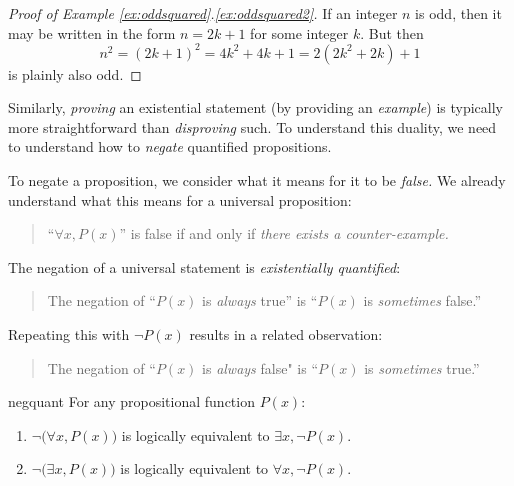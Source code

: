 \begin{proof}[Proof of Example \ref*{ex:oddsquared}.\ref{ex:oddsquared2}]
	If an integer $n$ is odd, then it may be written in the form $n=2k+1$ for some integer $k$. But then
	\[
		n^2 =(2k+1)^2 =4k^2+4k+1 =2(2k^2+2k)+1
		\]
	is plainly also odd.
\end{proof}

Similarly, \emph{proving} an existential statement (by providing an \emph{example}) is typically more straightforward than \emph{disproving} such. To understand this duality, we need to understand how to \emph{negate} quantified propositions.

\goodbreak



To negate a proposition, we consider what it means for it to be \emph{false.} We already understand what this means for a universal proposition:
\begin{quote}
	``$\forall x,P(x)$'' is false if and only if \emph{there exists a counter-example.}
\end{quote}
The negation of a universal statement is \emph{existentially quantified}:
\begin{quote}
	The negation of ``$P(x)$ is \emph{always} true'' is ``$P(x)$ is \emph{sometimes} false.''
\end{quote}
Repeating this with $\neg P(x)$ results in a related observation:
\begin{quote}
	The negation of ``$P(x)$ is \emph{always} false" is ``$P(x)$ is \emph{sometimes} true.''
\end{quote}

\begin{thm}{}{negquant}
	For any propositional function $P(x)$:
	\begin{enumerate}
	  \item $\neg\bigl(\forall x, P(x)\bigr)$ is logically equivalent to $\exists x, \neg P(x)$.
	  \item $\neg\bigl(\exists x, P(x)\bigr)$ is logically equivalent to $\forall x, \neg P(x)$.
	\end{enumerate}
\end{thm}


